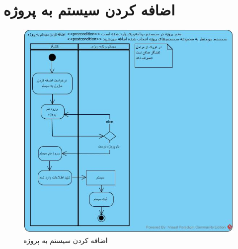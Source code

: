 \section{اضافه کردن سیستم به پروژه}
\begin{figure}[H]
	\centering
	\includegraphics[scale=0.7]{img/activity/AddSystemToProject}
	\caption{اضافه کردن سیستم به پروژه}
\end{figure}

